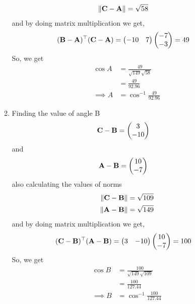 \documentclass[10pt]{book}
\begin{document}
\begin{enumerate}[label=\thesection.\arabic*.,ref=\thesection.\theenumi]
\begin{enumerate}
\begin{align}
 \left\lVert\mathbf{C}-\mathbf{A}\right\rVert &= \sqrt{58}
\end{align}
and by doing matrix multiplication we get,
\begin{align}
\begin{split}
 (\mathbf{B}-\mathbf{A})^{\top}(\mathbf{C}-\mathbf{A}) &= \begin{pmatrix}-10&7\end{pmatrix}\begin{pmatrix}-7\\-3\end{pmatrix} = 49
\end{split}
\end{align}
So, we get
\begin{align}
 \cos{A} &= \frac{49}{\sqrt{149} \sqrt{58}}\\
 &= \frac{49}{92.96}\\
 \implies A& = \cos^{-1}{\frac{49}{92.96}}
\end{align}
\item Finding the value of angle B
\begin{align}
 \mathbf{C}-\mathbf{B} &=\begin{pmatrix} 3\\-10\end{pmatrix}
\end{align}
and 
\begin{align}
 \mathbf{A}-\mathbf{B} &= \begin{pmatrix}10\\-7\end{pmatrix}
\end{align}
also calculating the values of norms
\begin{align}
 \left\lVert\mathbf{C}-\mathbf{B}\right\rVert &= \sqrt{109}\\
 \left\lVert\mathbf{A}-\mathbf{B}\right\rVert &= \sqrt{149}
\end{align}
and by doing matrix multiplication we get,
\begin{align}
\begin{split}
 (\mathbf{C}-\mathbf{B})^{\top}(\mathbf{A}-\mathbf{B}) &= \begin{pmatrix}3&-10\end{pmatrix}\begin{pmatrix}10\\-7\end{pmatrix} = 100
\end{split}
\end{align}
So, we get 
\begin{align}
	\cos{B} &= \frac{100}{\sqrt{149} \sqrt{109}}\\
 &= \frac{100}{127.44}\\
 \implies B& = \cos^{-1}{\frac{100}{127.44}}
\end{align}


\end{enumerate}
\end{enumerate}
\end{document}
